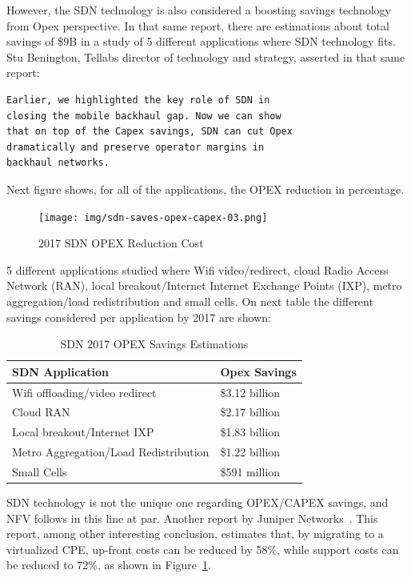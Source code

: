\documentclass[a4paper, 12pt]{book}
\begin{document}
However, the SDN technology is also considered a boosting savings technology from Opex perspective. In that same report, there are estimations about total savings of \$9B in a study of 5 different applications where SDN technology fits. Stu Benington, Tellabs director of technology and strategy, asserted in that same report:
\begin{verbatim}
Earlier, we highlighted the key role of SDN in
closing the mobile backhaul gap. Now we can show
that on top of the Capex savings, SDN can cut Opex
dramatically and preserve operator margins in
backhaul networks.
\end{verbatim}
Next figure shows, for all of the applications, the OPEX reduction in percentage.
\begin{center}
 \begin{figure}[H]
 \begin{center}
   \texttt{[image: img/sdn-saves-opex-capex-03.png]}
   \caption{2017 SDN OPEX Reduction Cost}
   \label{fig:sdnopexreduction}
 \end{center}
 \end{figure}
\end{center}
5 different applications studied where Wifi video/redirect, cloud Radio Access Network (RAN), local breakout/Internet Internet Exchange Points (IXP), metro aggregation/load redistribution and small cells. On next table the different savings considered per application by 2017 are shown:
\begin{table}[H]
\footnotesize
\begin{center}
\begin{tabular}{|l|l|}
\hline
\textbf{SDN Application} & \textbf{Opex Savings} \\ \hline
Wifi offloading/video redirect & \$3.12 billion \\ \hline
Cloud RAN & \$2.17 billion \\ \hline
Local breakout/Internet IXP &	\$1.83 billion  \\ \hline
Metro Aggregation/Load Redistribution & \$1.22 billion  \\ \hline
Small Cells & \$591 million  \\ \hline
\end{tabular}
\end{center}
\caption{SDN 2017 OPEX Savings Estimations}
\label{tab:2017sdnopexsavings}
\end{table}
SDN technology is not the unique one regarding OPEX/CAPEX savings, and NFV follows in this line at par. Another report by Juniper Networks~\cite{NFVSDNBusinessCase}. This report, among other interesting conclusion, estimates that, by migrating to a virtualized CPE, up-front costs can be reduced by 58\%, while support costs can be reduced to 72\%, as shown in Figure~\ref{fig:sdnopexreduction}.
\end{document}

